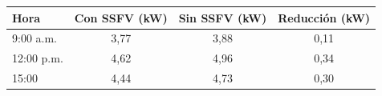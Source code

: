 \begin{tabular}{lccc}
\toprule
\textbf{Hora} & \textbf{Con SSFV (kW)} & \textbf{Sin SSFV (kW)} & \textbf{Reducción (kW)} \\
\midrule
9:00 a.m. & 3,77 & 3,88 & 0,11 \\
12:00 p.m. & 4,62 & 4,96 & 0,34 \\
15:00 & 4,44 & 4,73 & 0,30 \\
\bottomrule
\end{tabular}
